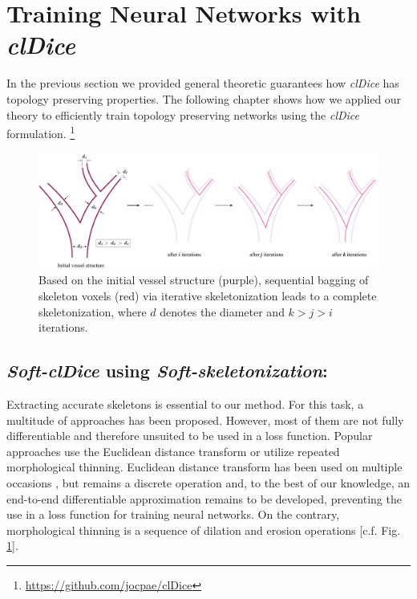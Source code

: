 \section{Training Neural Networks with \textbf{\textit{clDice}}}
In the previous section we provided general theoretic guarantees how \textit{clDice} has topology preserving properties. The following chapter shows how we applied our theory to efficiently train topology preserving networks using the \textit{clDice} formulation. \footnote{\url{https://github.com/jocpae/clDice}}

\begin{figure}[]
\begin{center}
\includegraphics[width=0.9\linewidth]{figs/sequence_toy.pdf}
\end{center}
\caption{ Based on the initial vessel structure (purple), sequential bagging of skeleton voxels (red) via iterative skeletonization leads to a complete skeletonization, where $d$ denotes the diameter and  $k>j>i$ iterations.}
\label{seq_skel}
\vspace{-1em}
\end{figure}

\subsection{\textbf{\textit{Soft-clDice}} using \textbf{\textit{Soft-skeletonization}}:}
Extracting accurate skeletons is essential to our method. For this task, a multitude of approaches has been proposed. However, most of them are not fully differentiable and therefore unsuited to be used in a loss function. Popular approaches use the Euclidean distance transform or utilize repeated morphological thinning. Euclidean distance transform has been used on multiple occasions \cite{shih1995skeletonization,wright1995skeletonization}, but remains a discrete operation and, to the best of our knowledge, an end-to-end differentiable approximation remains to be developed, preventing the use in a loss function for training neural networks.
On the contrary, morphological thinning is a sequence of dilation and erosion operations [c.f. Fig. \ref{seq_skel}].

